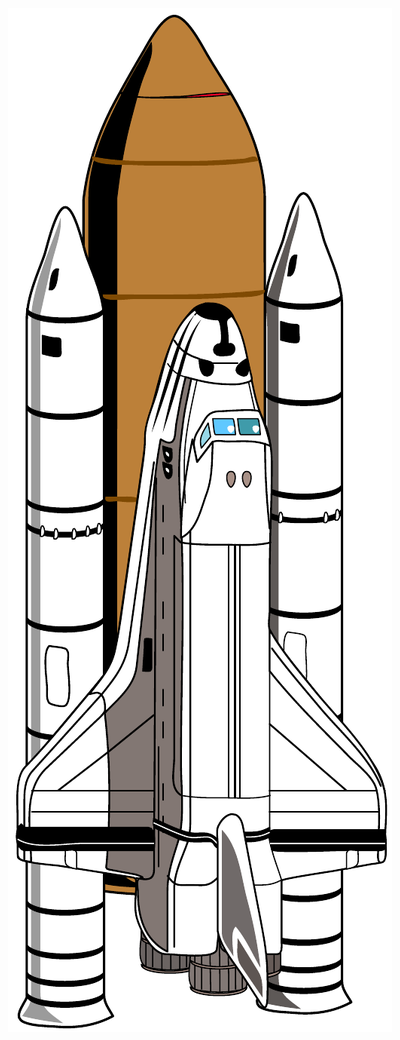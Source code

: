 \documentclass[aspectratio=169]{beamer}
\begin{document}
\begin{frame}
\begin{columns}
\begin{figure}
      \includegraphics[scale=0.13]{images/shuttle.pdf}
      \centering
    \end{figure}
  \end{columns}
\end{frame}
\end{document}
